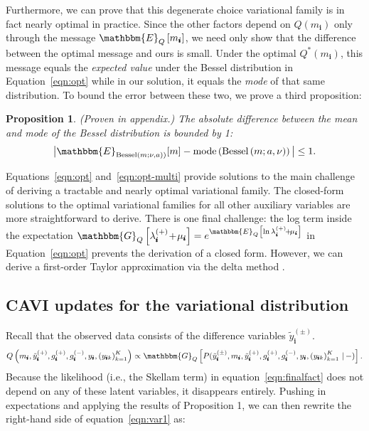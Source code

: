 \documentclass{article}
\newcommand{\subs}{\pmb{i}}
\newcommand{\wsup}[2]{#1_{\subs}^{(#2)}}
\newcommand{\ytP}{\wsup{\tilde{y}}{+}}
\newcommand{\ytPM}{\wsup{\tilde{y}}{\pm}}
\newcommand{\ysk}{y_{\subs k}}
\newcommand{\ys}{y_{\subs}}
\newcommand{\lamP}{\wsup{\lambda}{+}}
\newcommand{\gP}{\wsup{g}{+}}
\newcommand{\gM}{\wsup{g}{-}}
\newcommand{\mus}{\mu_{\subs}}
\newcommand{\ms}{m_{\subs}}
\newcommand{\Bess}[1]{\textup{Bessel}\left( #1 \right)}
\newcommand{\Eq}[1]{\mathbbm{E}_Q\left[#1\right]}
\newcommand{\Gq}[1]{\mathbbm{G}_Q\left[#1\right]}
\newcommand{\tp}{\!+\!}
\newtheorem{proposition}{Proposition}
\begin{document}
  Furthermore, we can prove that this degenerate choice variational family is in
  fact nearly optimal in practice. Since the other factors depend on $Q(\ms)$
  only through the message $\Eq{\ms}$, we need only show that the difference
  between the optimal message and ours is small. Under the optimal $Q^*(\ms)$,
  this message equals the \emph{expected value} under the Bessel distribution in
  Equation~\ref{eqn:opt} while in our solution, it equals the \emph{mode} of
  that same distribution. To bound the error between these two, we prove a
  third proposition:
  
  \begin{proposition} (Proven in appendix.) The absolute
  difference between the mean and mode of the Bessel distribution is bounded by
  1:
    \[ \big| \mathbbm{E}_{\Bess{m; \nu, a})}[m]  - \textup{mode} \left(\Bess{m;
    a, \nu} \right) \big|  \leq 1. \]
  \end{proposition}
  
  Equations~\ref{eqn:opt} and~\ref{eqn:opt-multi} provide solutions to the main
  challenge of deriving a tractable and nearly optimal variational family. The
  closed-form solutions to the optimal variational families for all other
  auxiliary variables are more straightforward to derive.
  There is one final
  challenge: the log term inside the expectation $\Gq{\lamP \tp \mus} =
  e^{\Eq{\ln \lamP \tp \mus}}$ in Equation~\ref{eqn:opt} prevents the derivation
  of a closed form. However, we can derive a first-order Taylor approximation
  via the delta method \citep{ver2012invented}.
  
  \subsection{CAVI updates for the variational distribution}
  \label{sec:cavi}
  Recall that the observed data consists of the difference variables $\ytPM$.
  \begin{equation}
    \label{eqn:var1}
  Q \left( \ms, \ytP, \gP, \gM, \ys, \left(\ysk\right)_{k=1}^K\right) \propto
   \Gq{P(\ytPM, \ms, \ytP, \gP, \gM, \ys, \left(\ysk\right)_{k=1}^K \,|\,-)}.
  \end{equation}
  Because the likelihood (i.e., the Skellam term) in
  equation~\ref{eqn:finalfact} does not depend on any of these latent variables,
  it disappears entirely. Pushing in expectations and applying the results of Proposition
  1, we can then rewrite the right-hand side of
  equation~\ref{eqn:var1} as:
    
\end{document}
